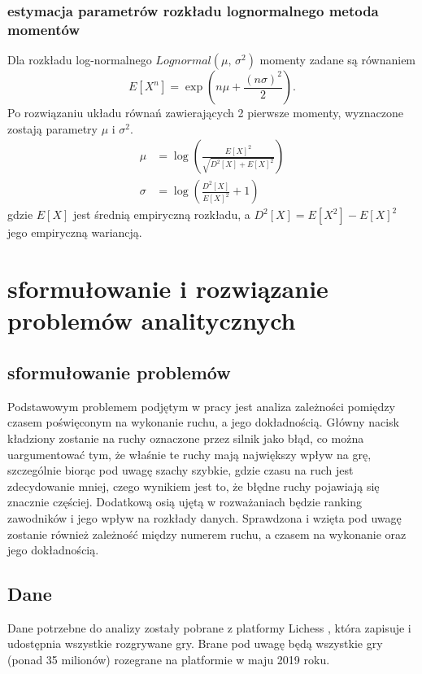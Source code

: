 \documentclass[inzynierska]{pwr_wmat_praca_dyplomowa}
\theoremstyle{plain}
\numberwithin{theorem}{chapter}
\theoremstyle{definition}
\numberwithin{theorem}{chapter}
\begin{document}
\subsection{estymacja parametrów rozkładu lognormalnego metoda momentów}
Dla rozkładu log-normalnego $Lognormal(\mu ,\,\sigma^{2})$ momenty zadane są równaniem \cite{lognorm}
\begin{equation*}
	E[X^n] = \exp (n\mu+\frac{(n\sigma)^2}{2}).
\end{equation*}
Po rozwiązaniu układu równań zawierających 2 pierwsze momenty, wyznaczone zostają parametry $\mu$ i $\sigma^2$. 
\begin{align*} 
	\mu &= \log\left(\frac{E[X]^2}{\sqrt{D^2[X]+E[X]^2}}\right) \\ 
	\sigma &=  \log\left(\frac{D^2[X]}{E[X]^2}+1\right)
\end{align*}
gdzie $E[X]$ jest średnią empiryczną rozkładu, a $D^2[X]=E[X^2]-E[X]^2$ jego empiryczną wariancją.


\chapter{sformułowanie i rozwiązanie problemów analitycznych}
\section{sformułowanie problemów}
Podstawowym problemem podjętym w pracy jest analiza zależności pomiędzy czasem poświęconym na wykonanie ruchu, a jego dokładnością. Główny nacisk kładziony zostanie na ruchy oznaczone przez silnik jako błąd, co można uargumentować tym, że właśnie te ruchy mają największy wpływ na grę, szczególnie biorąc pod uwagę szachy szybkie, gdzie czasu na ruch jest zdecydowanie mniej, czego wynikiem jest to, że błędne ruchy pojawiają się znacznie częściej. Dodatkową osią ujętą w rozważaniach będzie ranking zawodników i jego wpływ na rozkłady danych. Sprawdzona i wzięta pod uwagę zostanie również zależność między numerem ruchu, a czasem na wykonanie oraz jego dokładnością.

\section{Dane}
Dane potrzebne do analizy zostały pobrane z platformy Lichess \cite{lichess}, która zapisuje i udostępnia wszystkie rozgrywane gry. Brane pod uwagę będą wszystkie gry (ponad 35 milionów) rozegrane na platformie w maju 2019 roku.
\end{document}
